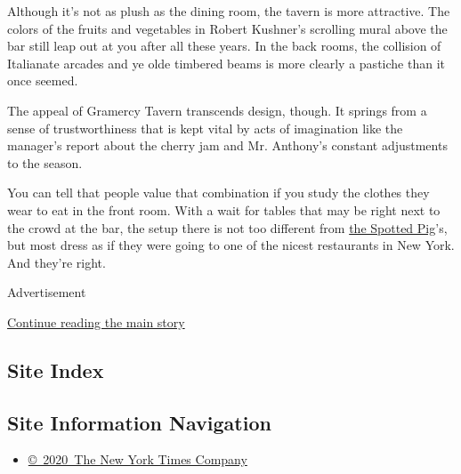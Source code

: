 Although it's not as plush as the dining room, the tavern is more
attractive. The colors of the fruits and vegetables in Robert Kushner's
scrolling mural above the bar still leap out at you after all these
years. In the back rooms, the collision of Italianate arcades and ye
olde timbered beams is more clearly a pastiche than it once seemed.

The appeal of Gramercy Tavern transcends design, though. It springs from
a sense of trustworthiness that is kept vital by acts of imagination
like the manager's report about the cherry jam and Mr. Anthony's
constant adjustments to the season.

You can tell that people value that combination if you study the clothes
they wear to eat in the front room. With a wait for tables that may be
right next to the crowd at the bar, the setup there is not too different
from
\href{http://www.nytimes3xbfgragh.onion/2016/04/20/dining/salvation-burger-spotted-pig-review.html}{the
Spotted Pig}'s, but most dress as if they were going to one of the
nicest restaurants in New York. And they're right.

Advertisement

\protect\hyperlink{after-bottom}{Continue reading the main story}

\hypertarget{site-index}{%
\subsection{Site Index}\label{site-index}}

\hypertarget{site-information-navigation}{%
\subsection{Site Information
Navigation}\label{site-information-navigation}}

\begin{itemize}
\tightlist
\item
  \href{https://help.nytimes3xbfgragh.onion/hc/en-us/articles/115014792127-Copyright-notice}{©~2020~The
  New York Times Company}
\end{itemize}

